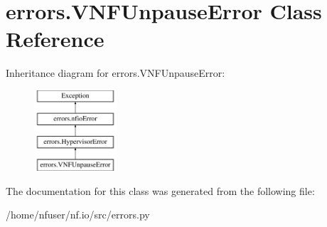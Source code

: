 \hypertarget{classerrors_1_1VNFUnpauseError}{\section{errors.\-V\-N\-F\-Unpause\-Error Class Reference}
\label{classerrors_1_1VNFUnpauseError}
}
Inheritance diagram for errors.\-V\-N\-F\-Unpause\-Error\-:\begin{figure}[H]
\begin{center}
\leavevmode
\includegraphics[height=3.000000cm]{classerrors_1_1VNFUnpauseError}
\end{center}
\end{figure}


The documentation for this class was generated from the following file\-:\begin{DoxyCompactItemize}
\item 
/home/nfuser/nf.\-io/src/errors.\-py\end{DoxyCompactItemize}

